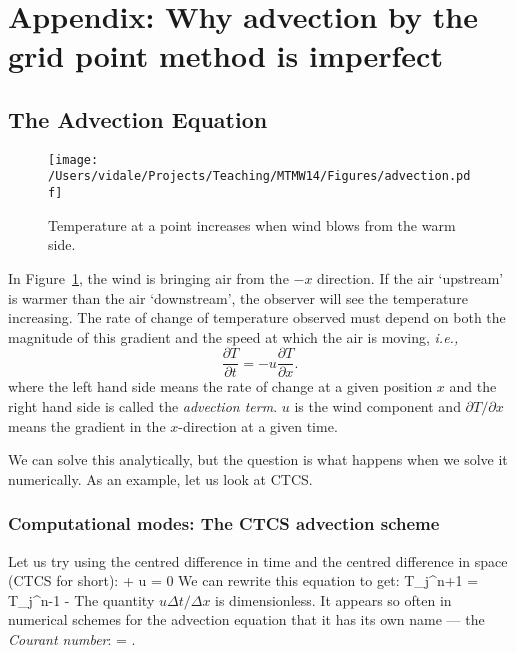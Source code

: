 \section{Appendix: Why advection by the grid point method is imperfect}

\subsection{The Advection Equation}

\begin{figure}[h]
	\begin{center}
		\texttt{[image: /Users/vidale/Projects/Teaching/MTMW14/Figures/advection.pdf]}
	\end{center}
	\caption{Temperature at a point increases when wind blows from the warm side.}
	\label{fig:ken}
\end{figure}


In Figure~\ref{fig:ken}, the wind is bringing air from the $-x$
direction. If the air `upstream' is warmer than the air `downstream',
the observer will see the temperature increasing. The rate of change of
temperature observed must depend on both the magnitude of this
gradient and the speed at which the air is moving, {\em i.e.,}
\begin{equation}
	\frac{\partial T}{\partial t} =- u \frac{\partial T}{\partial x}.
	\label{advectioncont}
\end{equation}
where the left hand side means the rate of change at a given position
$x$ and the right hand side is called the {\em advection term}. $u$ is
the wind component and $\partial T/\partial x$ means the gradient in
the $x$-direction at a given time. 

We can solve this analytically, but the question is what happens when we solve it numerically. As an example, let us look at CTCS.

\subsubsection{Computational modes: The CTCS advection scheme}

Let us try using the centred difference in time and the
centred difference in space (CTCS for short):
\BEQ {} + u  = 0 \EEQ
We can rewrite this equation to get:
\BEQ T_{j}^{n+1} = T_{j}^{n-1} -  \left[ T_{j+1}^{n} - T_{j-1}^{n} \right] \label{ctcsmodel} \EEQ
The quantity $u\Delta t / \Delta x$ is dimensionless.  It appears so often in
numerical schemes for the advection equation that it has its own name --- the
\emph{Courant number}:
\BEQ \alpha =  .\EEQ

